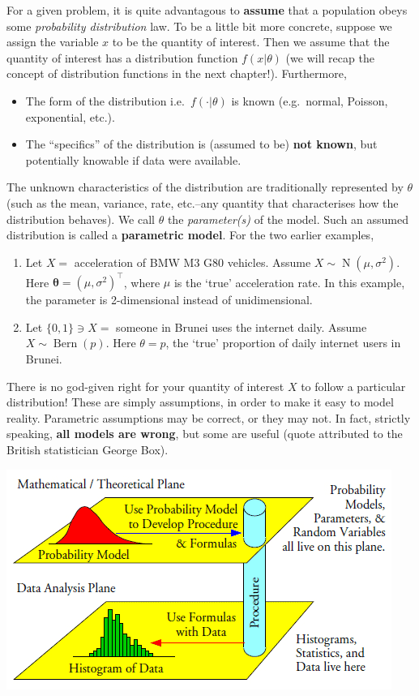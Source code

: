 \documentclass[
]{book}
\newcommand{\btheta}{{\boldsymbol\theta}}
\DeclareMathOperator{\N}{N}
\DeclareMathOperator{\Bern}{Bern}
\theoremstyle{definition}
\theoremstyle{definition}
\theoremstyle{definition}
\theoremstyle{definition}
\theoremstyle{remark}
\begin{document}
For a given problem, it is quite advantagous to \textbf{assume} that a population obeys some \emph{probability distribution} law.
To be a little bit more concrete, suppose we assign the variable \(x\) to be the quantity of interest. Then we assume that the quantity of interest has a distribution function \(f(x|\theta)\) (we will recap the concept of distribution functions in the next chapter!).
Furthermore,

\begin{itemize}
\item
  The form of the distribution i.e.~\(f(\cdot|\theta)\) is known (e.g.~normal, Poisson, exponential, etc.).
\item
  The ``specifics'' of the distribution is (assumed to be) \textbf{not known}, but potentially knowable if data were available.
\end{itemize}

The unknown characteristics of the distribution are traditionally represented by \(\theta\) (such as the mean, variance, rate, etc.--any quantity that characterises how the distribution behaves).
We call \(\theta\) the \emph{parameter(s)} of the model.
Such an assumed distribution is called a \textbf{parametric model}.
For the two earlier examples,

\begin{enumerate}
\def\labelenumi{\arabic{enumi}.}
\item
  Let \(X =\) acceleration of BMW M3 G80 vehicles. Assume \(X\sim\N(\mu,\sigma^2)\). Here \(\btheta = (\mu,\sigma^2)^\top\), where \(\mu\) is the `true' acceleration rate. In this example, the parameter is 2-dimensional instead of unidimensional.
\item
  Let \(\{0,1\} \ni X =\) someone in Brunei uses the internet daily. Assume \(X\sim\Bern(p)\). Here \(\theta = p\), the `true' proportion of daily internet users in Brunei.
\end{enumerate}

There is no god-given right for your quantity of interest \(X\) to follow a particular distribution! These are simply assumptions, in order to make it easy to model reality. Parametric assumptions may be correct, or they may not. In fact, strictly speaking, \textbf{all models are wrong}, but some are useful (quote attributed to the British statistician George Box).

\begin{center}\includegraphics[width=0.8\linewidth]{figure/00-theoreticaldataplane} \end{center}
\end{document}
